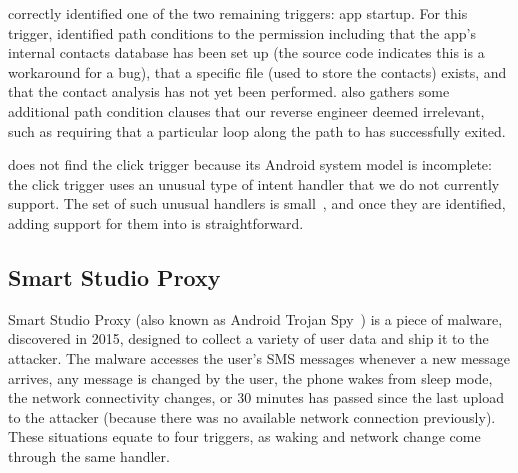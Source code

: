 \hogarth{} correctly identified one of the two remaining triggers: app startup.
For this trigger, \hogarth{} identified path conditions to the  
permission including that the app's internal contacts
database has been set up (the source code indicates this is a
workaround for a bug), that a specific file (used to store the
contacts) exists, and that the contact analysis has not yet been performed. 
\hogarth{} also gathers some additional path condition clauses that 
our reverse engineer deemed irrelevant, such as requiring that a 
particular loop along the path to  has successfully 
exited.

\hogarth{} does not find the click trigger because its Android system model 
is incomplete: the click trigger uses an unusual type of intent handler that 
we do not currently support. The set of such unusual handlers is small~\cite{cao:2015:edgeminer}, 
and once they are identified, adding support for them into \hogarth{} is straightforward.



\subsection{Smart Studio Proxy}
Smart Studio Proxy (also known as Android Trojan Spy~\cite{trojanspy})
is a piece of malware, discovered in 2015, designed to collect a
variety of user data and ship it to the attacker. The malware accesses
the user's SMS messages whenever a new message arrives, any message is
changed by the user, the phone wakes from sleep mode, the network
connectivity changes, or 30 minutes has passed since the last upload
to the attacker (because there was no available network connection
previously). These situations equate to four triggers, as waking and 
network change come through the same  handler.

